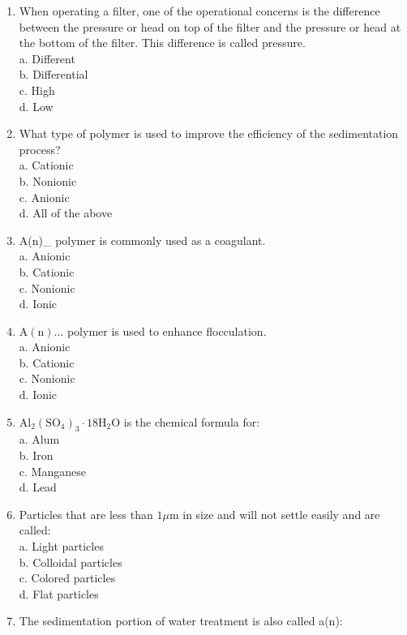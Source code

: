 \begin{enumerate}
\item When operating a filter, one of the operational concerns is the difference between the pressure or head on top of the filter and the pressure or head at the bottom of the filter. This difference is called pressure.\\
a. Different\\
b. Differential\\
c. High\\
d. Low\\
\item What type of polymer is used to improve the efficiency of the sedimentation process?\\
a. Cationic\\
b. Nonionic\\
c. Anionic\\
d. All of the above\\
\item A(n)\_ polymer is commonly used as a coagulant.\\
a. Anionic\\
b. Cationic\\
c. Nonionic\\
d. Ionic\\
\item $\mathrm{A}(\mathrm{n}) \ldots$ polymer is used to enhance flocculation.\\
a. Anionic\\
b. Cationic\\
c. Nonionic\\
d. Ionic\\
\item $\mathrm{Al}_{2}\left(\mathrm{SO}_{4}\right)_{3} \cdot 18 \mathrm{H}_{2} \mathrm{O}$ is the chemical formula for:\\
a. Alum\\
b. Iron\\
c. Manganese\\
d. Lead\\
\item Particles that are less than $1 \mu \mathrm{m}$ in size and will not settle easily and are called:\\
a. Light particles\\
b. Colloidal particles\\
c. Colored particles\\
d. Flat particles\\
\item The sedimentation portion of water treatment is also called a(n):\\

\end{enumerate}

